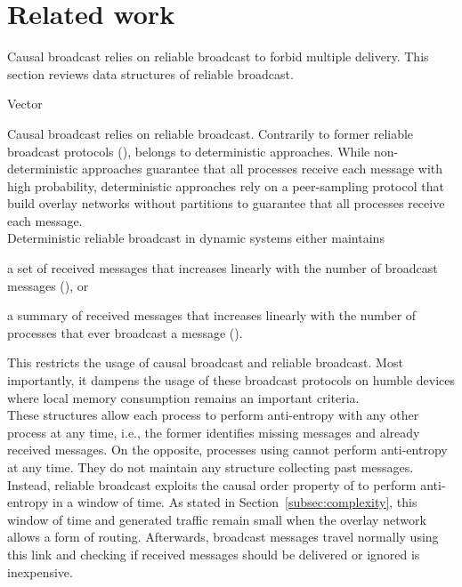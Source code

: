 
\section{Related work}
\label{sec:relatedwork}

Causal broadcast relies on reliable broadcast to forbid multiple delivery.  This
section reviews data structures of reliable broadcast. 

Vector 






Causal broadcast relies on reliable broadcast. 
Contrarily to former reliable broadcast protocols (\REF), \RPCBROADCAST belongs
to deterministic approaches. While non-deterministic approaches guarantee that
all processes receive each message with high probability, deterministic
approaches rely on a peer-sampling protocol that build overlay networks without
partitions to guarantee that all processes receive each message. \\
Deterministic reliable broadcast in dynamic systems either maintains
\begin{inparaenum}[(i)]
\item a set of received messages that increases linearly with the number of
  broadcast messages (\REF), or
\item a summary of received messages that increases linearly with the number of
  processes that ever broadcast a message (\REF). 
\end{inparaenum}
This restricts the usage of causal broadcast and reliable broadcast. Most
importantly, it dampens the usage of these broadcast protocols on humble devices
where local memory consumption remains an important criteria. \\
These structures allow each process to perform anti-entropy with any other
process at any time, i.e., the former identifies missing messages and already
received messages. On the opposite, processes using \RPCBROADCAST cannot perform
anti-entropy at any time. They do not maintain any structure collecting past
messages. Instead, reliable broadcast exploits the causal order property of
\RPCBROADCAST to perform anti-entropy in a window of time. As stated in
Section~\ref{subsec:complexity}, this window of time and generated traffic
remain small when the overlay network allows a form of routing. Afterwards,
broadcast messages travel normally using this link and checking if received
messages should be delivered or ignored is inexpensive.

